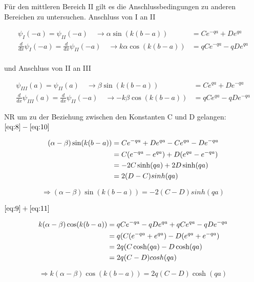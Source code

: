 Für den mittleren Bereich II gilt es die Anschlussbedingungen zu anderen Bereichen zu untersuchen. Anschluss von I an II


\begin{align}
  \psi_{I}(-a) = \psi_{II}(-a) \quad\rightarrow    \alpha\sin(k(b-a)) &= Ce^{-qa}+De^{qa} \label{eq:8} \\
\frac{d}{dx}\psi_{I}(-a) =\frac{d}{dx}\psi_{II}(-a) \quad \rightarrow   k\alpha\cos(k(b-a)) &= qCe^{-qa}-qDe^{qa}\label{eq:9}
\end{align}
\\
und Anschluss von II an III

\begin{align}
  \psi_{III}(a) = \psi_{II}(a) \quad\rightarrow  \beta\sin(k(b-a)) &= Ce^{qa}+De^{-qa} \label{eq:10} \\
  \frac{d}{dx}\psi_{III}(a) =\frac{d}{dx}\psi_{II}(-a) \quad\rightarrow   -k\beta\cos(k(b-a)) &= qCe^{qa}-qDe^{-qa} \label{eq:11}
\end{align}

NR um zu der Beziehung zwischen den Konstanten C und D gelangen:
\( \eqref{eq:8}-\eqref{eq:10}  \)

\begin{align}
  \label{eq:12}
  (\alpha-\beta)\sin(k(b-a)) &= Ce^{-qa}+De^{qa}- Ce^{qa}-De^{-qa} \notag \\
&= C(e^{-qa}- e^{qa})+D(e^{qa}-e^{-qa}) \notag\\
&=-2C\sinh(qa)+2D\sinh(qa) \notag\\
&=2(D-C)sinh(qa)
\end{align}

\begin{equation}
  \label{eq:13}
 \Rightarrow  (\alpha-\beta)\sin(k(b-a))=-2(C-D)sinh(qa)
\end{equation}

\( \eqref{eq:9}+\eqref{eq:11}  \)

\begin{align}
  \label{eq:14}
  k(\alpha-\beta)\cos(k(b-a)) &= qCe^{-qa}-qDe^{qa}+ qCe^{qa}-qDe^{-qa}  \notag\\
&= q(C(e^{-qa}+ e^{qa})-D(e^{qa}+e^{-qa}) \notag\\
&= 2q(C\cosh(qa)-D\cosh(qa) \notag\\
&=2q(C-D)cosh(qa)
\end{align}

\begin{equation}
  \label{eq:15}
 \Rightarrow  k(\alpha-\beta)\cos(k(b-a))=2q(C-D)\cosh(qa)
\end{equation}


